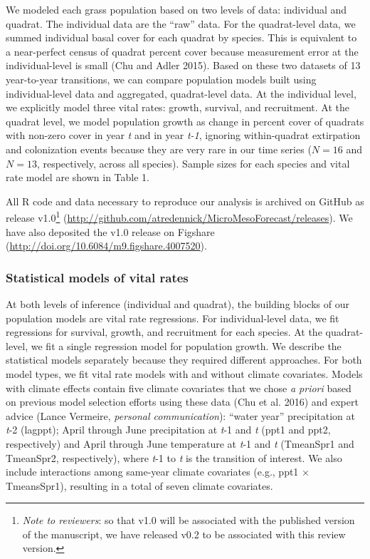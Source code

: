 \documentclass[12pt,]{article}
\let\rmarkdownfootnote\footnote%
\def\footnote{\protect\rmarkdownfootnote}
\begin{document}
We modeled each grass population based on two levels of data: individual
and quadrat. The individual data are the ``raw'' data. For the
quadrat-level data, we summed individual basal cover for each quadrat by
species. This is equivalent to a near-perfect census of quadrat percent
cover because measurement error at the individual-level is small (Chu
and Adler 2015). Based on these two datasets of 13 year-to-year
transitions, we can compare population models built using
individual-level data and aggregated, quadrat-level data. At the
individual level, we explicitly model three vital rates: growth,
survival, and recruitment. At the quadrat level, we model population
growth as change in percent cover of quadrats with non-zero cover in
year \emph{t} and in year \emph{t-1}, ignoring within-quadrat
extirpation and colonization events because they are very rare in our
time series (\(N=16\) and \(N=13\), respectively, across all species).
Sample sizes for each species and vital rate model are shown in Table 1.

All R code and data necessary to reproduce our analysis is archived on
GitHub as release v1.0\footnote{\emph{Note to reviewers}: so that v1.0
  will be associated with the published version of the manuscript, we
  have released v0.2 to be associated with this review version.}
(\url{http://github.com/atredennick/MicroMesoForecast/releases}). We
have also deposited the v1.0 release on Figshare (\url{http://doi.org/10.6084/m9.figshare.4007520}).

\subsubsection{Statistical models of vital
rates}\label{statistical-models-of-vital-rates}

At both levels of inference (individual and quadrat), the building
blocks of our population models are vital rate regressions. For
individual-level data, we fit regressions for survival, growth, and
recruitment for each species. At the quadrat-level, we fit a single
regression model for population growth. We describe the statistical
models separately because they required different approaches. For both
model types, we fit vital rate models with and without climate
covariates. Models with climate effects contain five climate covariates
that we chose \emph{a priori} based on previous model selection efforts
using these data (Chu et al. 2016) and expert advice (Lance Vermeire,
\emph{personal communication}): ``water year'' precipitation at
\emph{t}-2 (lagppt); April through June precipitation at \emph{t}-1 and
\emph{t} (ppt1 and ppt2, respectively) and April through June
temperature at \emph{t}-1 and \emph{t} (TmeanSpr1 and TmeanSpr2,
respectively), where \emph{t}-1 to \emph{t} is the transition of
interest. We also include interactions among same-year climate
covariates (e.g., ppt1 \(\times\) TmeansSpr1), resulting in a total of
seven climate covariates.
\end{document}
